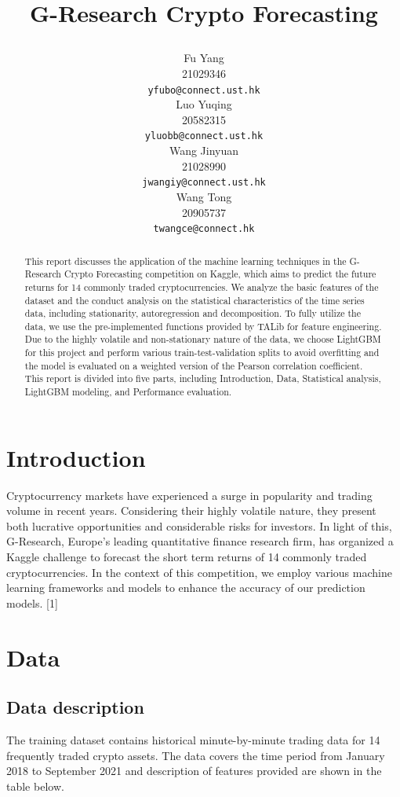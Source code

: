 \documentclass{article}
\title{

G-Research Crypto Forecasting}
\author{%
  Fu Yang \\
  21029346\\
  \texttt{yfubo@connect.ust.hk} \\
  \And
  Luo Yuqing \\
  20582315\\
  \texttt{yluobb@connect.ust.hk} \\
  \AND
  Wang Jinyuan \\
  21028990\\
  \texttt{jwangiy@connect.ust.hk} \\
  \And
  Wang Tong \\
  20905737\\
  \texttt{twangce@connect.hk} \\
}
\begin{document}
\maketitle

\begin{abstract}
This report discusses the application of the machine learning techniques in the G-Research Crypto Forecasting competition on Kaggle, which aims to predict the future returns for 14 commonly traded cryptocurrencies. We analyze the basic features of the dataset and the conduct analysis on the statistical characteristics of the time series data, including stationarity, autoregression and decomposition. To fully utilize the data, we use the pre-implemented functions provided by TALib for feature engineering. Due to the highly volatile and non-stationary nature of the data, we choose LightGBM for this project and perform various train-test-validation splits to avoid overfitting and the model is evaluated on a weighted version of the Pearson correlation coefficient. This report is divided into five parts, including Introduction, Data, Statistical analysis, LightGBM modeling, and Performance evaluation. 


\end{abstract}

\section{Introduction}

Cryptocurrency markets have experienced a surge in popularity and trading volume in recent years. Considering their highly volatile nature, they present both lucrative opportunities and considerable risks for investors. In light of this, G-Research, Europe's leading quantitative finance research firm, has organized a Kaggle challenge to forecast the short term returns of 14 commonly traded cryptocurrencies. In the context of this competition, we employ various machine learning frameworks and models to enhance the accuracy of our prediction models. [1]


\section{Data}
\subsection{Data description}

The training dataset contains historical minute-by-minute trading data for 14 frequently traded crypto assets. The data covers the time period from January 2018 to September 2021 and description of features provided are shown in the table below. 
\end{document}
